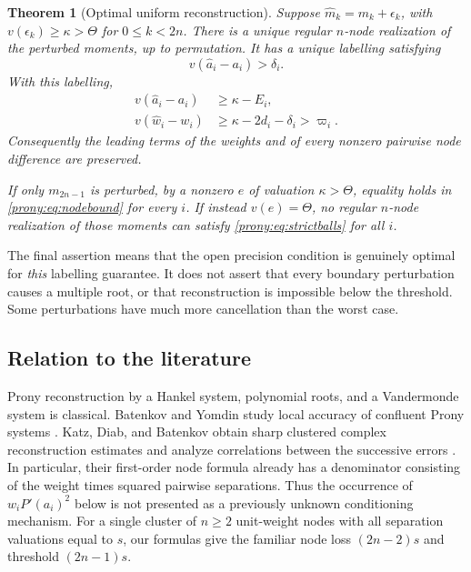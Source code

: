 \documentclass[11pt,letterpaper]{article}
\newtheorem{theorem}{Theorem}[section]
\theoremstyle{definition}
\theoremstyle{remark}
\newcommand{\ah}{\widehat a}
\newcommand{\wh}{\widehat w}
\newcommand{\mh}{\widehat m}
\begin{document}
\begin{theorem}[Optimal uniform reconstruction]\label{prony:thm:main}
Suppose $\mh_k=m_k+\epsilon_k$, with $v(\epsilon_k)\ge\kappa>\Theta$ for
$0\le k<2n$. There is a unique regular $n$-node realization of the perturbed
moments, up to permutation. It has a unique labelling satisfying
\begin{equation}\label{prony:eq:strictballs}
 v(\ah_i-a_i)>\delta_i.
\end{equation}
With this labelling,
\begin{align}
 v(\ah_i-a_i)&\ge\kappa-E_i,\label{prony:eq:nodebound}\\
 v(\wh_i-w_i)&\ge\kappa-2d_i-\delta_i>\varpi_i.\label{prony:eq:weightbound}
\end{align}
Consequently the leading terms of the weights and of every nonzero
pairwise node difference are preserved.

If only $m_{2n-1}$ is perturbed, by a nonzero $e$ of valuation
$\kappa>\Theta$, equality holds in \eqref{prony:eq:nodebound} for every $i$.
If instead $v(e)=\Theta$, no regular $n$-node realization of those moments
can satisfy \eqref{prony:eq:strictballs} for all $i$.
\end{theorem}

The final assertion means that the open precision condition is genuinely
optimal for \emph{this} labelling guarantee. It does not assert that every
boundary perturbation causes a multiple root, or that reconstruction is
impossible below the threshold. Some perturbations have much more
cancellation than the worst case.

\subsection{Relation to the literature}
Prony reconstruction by a Hankel system, polynomial roots, and a Vandermonde
system is classical. Batenkov and Yomdin study local accuracy of confluent
Prony systems \cite{BY}. Katz, Diab, and Batenkov obtain sharp clustered
complex reconstruction estimates and analyze correlations between the
successive errors \cite{KDB}. In particular, their first-order node formula
already has a denominator consisting of the weight times squared pairwise
separations. Thus the occurrence of $w_iP'(a_i)^2$ below is not presented as
a previously unknown conditioning mechanism. For a single cluster of $n\ge2$
unit-weight nodes with all separation valuations equal to $s$, our formulas
give the familiar node loss $(2n-2)s$ and threshold $(2n-1)s$.
\end{document}
